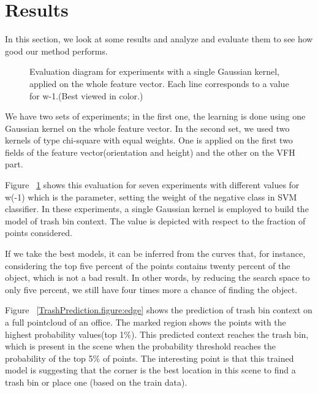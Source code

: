\section{Results}
\label{Results.sec}
In this section, we look at some results and analyze and evaluate them to see how good our method performs.



\begin{figure}[t]
  \caption[Evaluation diagram for experiments with a single Gaussian kernel.]
  {Evaluation diagram for experiments with a single Gaussian kernel, applied on the whole feature vector. Each line corresponds to a value for w-1.(Best viewed in color.)}
  \label{evalSevenExp.figure}
\end{figure}
We have two sets of experiments; in the first one, the learning is done using one Gaussian kernel on the whole feature vector.
In the second set, we used two kernels of type chi-square with equal weights.
One is applied on the first two fields of the feature vector(orientation and height) and the other on the VFH part.

Figure ~\ref{evalSevenExp.figure} shows this evaluation for seven experiments with different values for w(-1) which is the 
parameter, setting the weight of the negative class in SVM classifier.
In these experiments, a single Gaussian kernel is employed to build the model of trash bin context.
The value is depicted with respect to the fraction of points considered.

If we take the best models, it can be inferred from the curves that, for instance, considering the top five percent of the points 
contains twenty percent of the object, which is not a bad result. 
In other words, by reducing the search space to only five percent, we still have four times more a chance of finding the object.



Figure ~\ref{TrashPrediction.figure:edge} shows the prediction of trash bin context on a full pointcloud of an office. 
The marked region shows the points with the highest probability values(top 1\%).
This predicted context reaches the trash bin, which is present in the scene when the probability threshold reaches the 
probability of the top 5\% of points.
The interesting point is that this trained model is suggesting that the corner is the best location in this scene to find a 
trash bin or place one (based on the train data).

